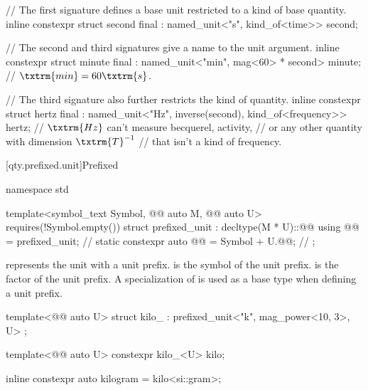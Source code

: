 \pnum
\begin{example}
\begin{codeblock}
// The first signature defines a base unit restricted to a kind of base quantity.
inline constexpr struct second final : named_unit<"s", kind_of<time>> {
} second;

// The second and third signatures give a name to the unit argument.
inline constexpr struct minute final : named_unit<"min", mag<60> * second> {
} minute;  // $\txtrm{min} = 60 \txtrm{ s}$.

// The third signature also further restricts the kind of quantity.
inline constexpr struct hertz final : named_unit<"Hz", inverse(second), kind_of<frequency>> {
} hertz;  // $\txtrm{Hz}$ can't measure becquerel, activity,
          // or any other quantity with dimension $\txtrm{T}^{-1}$
          // that isn't a kind of frequency.
\end{codeblock}
\end{example}

[qty.prefixed.unit]{Prefixed}

\begin{codeblock}
namespace std {

template<symbol_text Symbol, @@ auto M, @@ auto U>
  requires(!Symbol.empty())
struct prefixed_unit : decltype(M * U)::@@ {
  using @@ = prefixed_unit;                   // \expos
  static constexpr auto @@ = Symbol + U.@@;  // \expos
};

}
\end{codeblock}

\pnum
{} represents the unit  with a unit prefix.
 is the symbol of the unit prefix.
 is the factor of the unit prefix.
A specialization of  is used as a base type when defining a unit prefix.
\begin{example}
\begin{codeblock}
template<@@ auto U>
struct kilo_ : prefixed_unit<"k", mag_power<10, 3>, U> {};

template<@@ auto U>
constexpr kilo_<U> kilo;

inline constexpr auto kilogram = kilo<si::gram>;
\end{codeblock}
\end{example}

